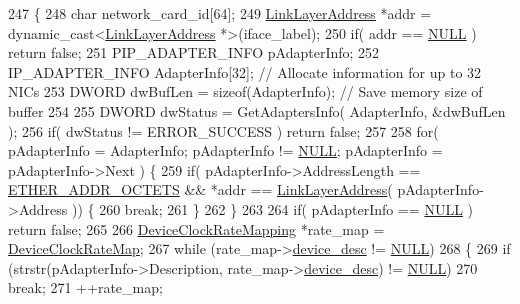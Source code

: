 \begin{DoxyCode}
247                                                                                                            
        \{
248     \textcolor{keywordtype}{char} network\_card\_id[64];
249     \hyperlink{class_link_layer_address}{LinkLayerAddress} *addr = \textcolor{keyword}{dynamic\_cast<}\hyperlink{class_link_layer_address}{LinkLayerAddress} *\textcolor{keyword}{>}(iface\_label);
250     \textcolor{keywordflow}{if}( addr == \hyperlink{openavb__types__base__pub_8h_a070d2ce7b6bb7e5c05602aa8c308d0c4}{NULL} ) \textcolor{keywordflow}{return} \textcolor{keyword}{false};
251     PIP\_ADAPTER\_INFO pAdapterInfo;
252     IP\_ADAPTER\_INFO AdapterInfo[32];       \textcolor{comment}{// Allocate information for up to 32 NICs}
253     DWORD dwBufLen = \textcolor{keyword}{sizeof}(AdapterInfo);  \textcolor{comment}{// Save memory size of buffer}
254 
255     DWORD dwStatus = GetAdaptersInfo( AdapterInfo, &dwBufLen );
256     \textcolor{keywordflow}{if}( dwStatus != ERROR\_SUCCESS ) \textcolor{keywordflow}{return} \textcolor{keyword}{false};
257 
258     \textcolor{keywordflow}{for}( pAdapterInfo = AdapterInfo; pAdapterInfo != \hyperlink{openavb__types__base__pub_8h_a070d2ce7b6bb7e5c05602aa8c308d0c4}{NULL}; pAdapterInfo = pAdapterInfo->Next ) \{
259         \textcolor{keywordflow}{if}( pAdapterInfo->AddressLength == \hyperlink{ptptypes_8hpp_ab81d402a4929723091a6731508845125}{ETHER\_ADDR\_OCTETS} && *addr == 
      \hyperlink{class_link_layer_address}{LinkLayerAddress}( pAdapterInfo->Address )) \{
260             \textcolor{keywordflow}{break};
261         \}
262     \}
263 
264     \textcolor{keywordflow}{if}( pAdapterInfo == \hyperlink{openavb__types__base__pub_8h_a070d2ce7b6bb7e5c05602aa8c308d0c4}{NULL} ) \textcolor{keywordflow}{return} \textcolor{keyword}{false};
265 
266     \hyperlink{struct_device_clock_rate_mapping}{DeviceClockRateMapping} *rate\_map = \hyperlink{windows__hal_8hpp_a279bd78690d5f4dc78890dc5e0a9564c}{DeviceClockRateMap};
267     \textcolor{keywordflow}{while} (rate\_map->\hyperlink{struct_device_clock_rate_mapping_af296ea48c692225a5d06a2675a82b0df}{device\_desc} != \hyperlink{openavb__types__base__pub_8h_a070d2ce7b6bb7e5c05602aa8c308d0c4}{NULL})
268     \{
269         \textcolor{keywordflow}{if} (strstr(pAdapterInfo->Description, rate\_map->\hyperlink{struct_device_clock_rate_mapping_af296ea48c692225a5d06a2675a82b0df}{device\_desc}) != 
      \hyperlink{openavb__types__base__pub_8h_a070d2ce7b6bb7e5c05602aa8c308d0c4}{NULL})
270             \textcolor{keywordflow}{break};
271         ++rate\_map;

\end{DoxyCode}
